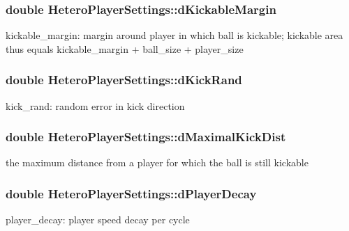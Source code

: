 \subsubsection[{\texorpdfstring{d\+Kickable\+Margin}{dKickableMargin}}]{\setlength{\rightskip}{0pt plus 5cm}double Hetero\+Player\+Settings\+::d\+Kickable\+Margin}\hypertarget{classHeteroPlayerSettings_a45c60e71a86c2424c9639a049b66b1c0}{}\label{classHeteroPlayerSettings_a45c60e71a86c2424c9639a049b66b1c0}
kickable\+\_\+margin\+: margin around player in which ball is kickable; kickable area thus equals kickable\+\_\+margin + ball\+\_\+size + player\+\_\+size 
\subsubsection[{\texorpdfstring{d\+Kick\+Rand}{dKickRand}}]{\setlength{\rightskip}{0pt plus 5cm}double Hetero\+Player\+Settings\+::d\+Kick\+Rand}\hypertarget{classHeteroPlayerSettings_a3eac27320ad6fdb15c45ee0f1325626e}{}\label{classHeteroPlayerSettings_a3eac27320ad6fdb15c45ee0f1325626e}
kick\+\_\+rand\+: random error in kick direction 
\subsubsection[{\texorpdfstring{d\+Maximal\+Kick\+Dist}{dMaximalKickDist}}]{\setlength{\rightskip}{0pt plus 5cm}double Hetero\+Player\+Settings\+::d\+Maximal\+Kick\+Dist}\hypertarget{classHeteroPlayerSettings_ab91fb7040a4a9eb7acbc82f80b1006a6}{}\label{classHeteroPlayerSettings_ab91fb7040a4a9eb7acbc82f80b1006a6}
the maximum distance from a player for which the ball is still kickable 
\subsubsection[{\texorpdfstring{d\+Player\+Decay}{dPlayerDecay}}]{\setlength{\rightskip}{0pt plus 5cm}double Hetero\+Player\+Settings\+::d\+Player\+Decay}\hypertarget{classHeteroPlayerSettings_afaa769b7ff145f0f56b3d4fb680ec81a}{}\label{classHeteroPlayerSettings_afaa769b7ff145f0f56b3d4fb680ec81a}
player\+\_\+decay\+: player speed decay per cycle 
